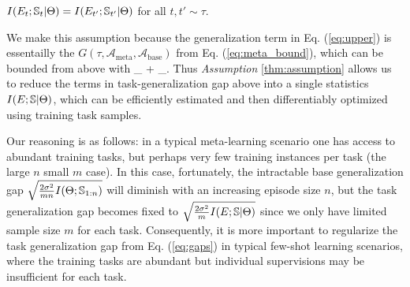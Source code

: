 \documentclass[nohyperref]{article}
\theoremstyle{plain}
\theoremstyle{definition}
\theoremstyle{remark}
\newcommand{\CA}{\mathcal{A}}
\newcommand{\meta}{\text{meta}}
\newcommand{\base}{\text{base}}
\begin{document}

\begin{assumption} $I(E_t;\mathbb{S}_t|\Theta) = I(E_{t'};\mathbb{S}_{t'}|\Theta) $ for all $t, t' \sim \tau$. 
\end{assumption}

We make this assumption because the generalization term in Eq. (\ref{eq:upper}) is essentailly the $G(\tau, \CA_{\meta}, \CA_{\base})$ from Eq. (\ref{eq:meta_bound}), which can be bounded from above with 
\beq
_{} + _{}. 
\label{eq:gaps}
\eeq
Thus {\it Assumption } \ref{thm:assumption} allows us to reduce the terms in task-generalization gap above into a single statistics $I(E;\mathbb{S}|\Theta)$, which can be efficiently estimated and then differentiably optimized using training task samples. 



Our reasoning is as follows: in a typical meta-learning scenario one has access to abundant training tasks, but perhaps very few training instances per task (the large $n$ small $m$ case). In this case, fortunately, the intractable base generalization gap $\sqrt{\frac{2 \sigma^2}{mn}I(\Theta;\mathbb{S}_{1:n})}$ will diminish with an increasing episode size $n$, but the task generalization gap becomes fixed to $\sqrt{\frac{2\sigma^2}{m} I(E;\mathbb{S}|\Theta)}$  since we only have limited sample size $m$ for each task. Consequently, it is more important to regularize the task generalization gap from Eq. (\ref{eq:gaps}) in typical few-shot learning scenarios, where the training tasks are abundant but individual supervisions may be insufficient for each task. 
\end{document}
